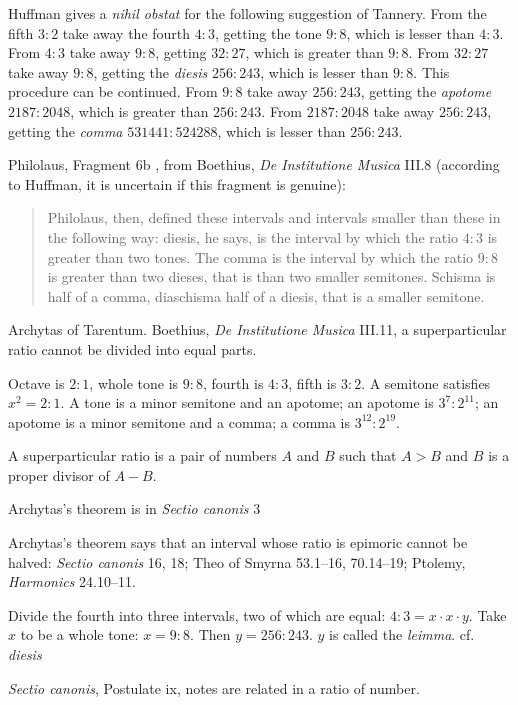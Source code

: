 \documentclass{article}
\theoremstyle{definition}
\begin{document}
Huffman \cite[p.~164]{philolaus} gives a {\em nihil obstat} for the following suggestion of Tannery. 
From the fifth $3:2$ take away the fourth $4:3$, getting the tone $9:8$, which is lesser than $4:3$.
From $4:3$ take away $9:8$, getting $32:27$, which is greater than $9:8$. From
$32:27$ take away $9:8$, getting the {\em diesis} $256:243$, which is lesser than $9:8$. This procedure can be continued.
From $9:8$ take away $256:243$, getting the {\em apotome} $2187:2048$, which is greater than $256:243$. From
$2187:2048$ take away $256:243$, getting the {\em comma} $531441:524288$, which is lesser than $256:243$. 

Philolaus, Fragment 6b \cite[p.~364]{philolaus}, from Boethius, {\em De Institutione Musica} III.8 (according to Huffman, it is uncertain if this fragment is genuine):

\begin{quote}
Philolaus, then, defined these intervals and intervals smaller than these in the following way: diesis, he says, is the interval by which the ratio
$4:3$ is greater than two tones. The comma is the interval by which the ratio $9:8$ is greater than two dieses, that is than two smaller semitones. Schisma is half of a comma,
 diaschisma half of a diesis, that is a smaller semitone.
\end{quote}

Archytas of Tarentum. Boethius, {\em De Institutione Musica} III.11, a superparticular ratio cannot be divided into equal parts.

Octave is $2:1$, whole tone is $9:8$, fourth is $4:3$, fifth is $3:2$. A semitone satisfies $x^2=2:1$. A tone is a minor semitone and an apotome;
an apotome is $3^7:2^{11}$; an apotome is a minor semitone and a comma; a comma is $3^{12}:2^{19}$.

A superparticular ratio is a pair of numbers $A$ and $B$ such that $A>B$ and
$B$ is a proper divisor of $A-B$.

Archytas's theorem is in {\em Sectio canonis} 3

Archytas's theorem says that an interval whose ratio is epimoric cannot be halved: {\em Sectio canonis} 16, 18; 
Theo of Smyrna 53.1--16, 70.14--19; 
Ptolemy, {\em Harmonics} 24.10--11.

Divide the fourth into three intervals, two of which are equal:
$4:3 = x \cdot x \cdot y$. Take $x$ to be a whole tone: $x=9:8$. Then $y=256:243$. 
$y$ is called the {\em leimma}. cf. {\em diesis}

{\em Sectio canonis}, Postulate ix, notes are related in a ratio of number.
\end{document}
